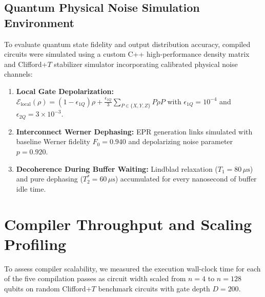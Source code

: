 \subsection{Quantum Physical Noise Simulation Environment}
To evaluate quantum state fidelity and output distribution accuracy, compiled circuits were simulated using a custom C++ high-performance density matrix and Clifford+$T$ stabilizer simulator incorporating calibrated physical noise channels:
\begin{enumerate}
    \item \textbf{Local Gate Depolarization:} $\mathcal{E}_{\text{local}}(\rho) = (1 - \epsilon_{1Q}) \rho + \frac{\epsilon_{1Q}}{3} \sum_{P \in \{X,Y,Z\}} P \rho P$ with $\epsilon_{1Q} = 10^{-4}$ and $\epsilon_{2Q} = 3 \times 10^{-3}$.
    \item \textbf{Interconnect Werner Dephasing:} EPR generation links simulated with baseline Werner fidelity $F_0 = 0.940$ and depolarizing noise parameter $p = 0.920$.
    \item \textbf{Decoherence During Buffer Waiting:} Lindblad relaxation ($T_1 = 80\,\mu\text{s}$) and pure dephasing ($T_2^* = 60\,\mu\text{s}$) accumulated for every nanosecond of buffer idle time.
\end{enumerate}

\section{Compiler Throughput and Scaling Profiling}
\label{sec:compiler_throughput}

To assess compiler scalability, we measured the execution wall-clock time for each of the five compilation passes as circuit width scaled from $n = 4$ to $n = 128$ qubits on random Clifford+$T$ benchmark circuits with gate depth $D = 200$.

